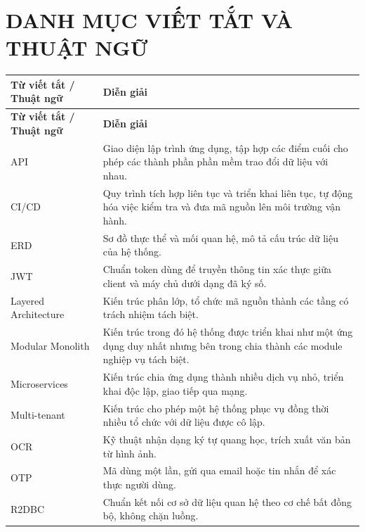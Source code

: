 \documentclass[12pt,a4paper,oneside]{report}
\begin{document}
\newpage
\listoffigures
{}

\newpage
\listoftables
{}

\newpage
\chapter*{DANH MỤC VIẾT TẮT VÀ THUẬT NGỮ}

\renewcommand{\arraystretch}{1.3}
\begin{longtable}{|>{\raggedright\arraybackslash}p{3.2cm}|>{\raggedright\arraybackslash}p{11.3cm}|}
\hline
\textbf{Từ viết tắt / Thuật ngữ} & \textbf{Diễn giải} \\ \hline
\endfirsthead
\hline
\textbf{Từ viết tắt / Thuật ngữ} & \textbf{Diễn giải} \\ \hline
\endhead
API & Giao diện lập trình ứng dụng, tập hợp các điểm cuối cho phép các thành phần phần mềm trao đổi dữ liệu với nhau. \\ \hline
CI/CD & Quy trình tích hợp liên tục và triển khai liên tục, tự động hóa việc kiểm tra và đưa mã nguồn lên môi trường vận hành. \\ \hline
ERD & Sơ đồ thực thể và mối quan hệ, mô tả cấu trúc dữ liệu của hệ thống. \\ \hline
JWT & Chuẩn token dùng để truyền thông tin xác thực giữa client và máy chủ dưới dạng đã ký số. \\ \hline
Layered Architecture & Kiến trúc phân lớp, tổ chức mã nguồn thành các tầng có trách nhiệm tách biệt. \\ \hline
Modular Monolith & Kiến trúc trong đó hệ thống được triển khai như một ứng dụng duy nhất nhưng bên trong chia thành các module nghiệp vụ tách biệt. \\ \hline
Microservices & Kiến trúc chia ứng dụng thành nhiều dịch vụ nhỏ, triển khai độc lập, giao tiếp qua mạng. \\ \hline
Multi-tenant & Kiến trúc cho phép một hệ thống phục vụ đồng thời nhiều tổ chức với dữ liệu được cô lập. \\ \hline
OCR & Kỹ thuật nhận dạng ký tự quang học, trích xuất văn bản từ hình ảnh. \\ \hline
OTP & Mã dùng một lần, gửi qua email hoặc tin nhắn để xác thực người dùng. \\ \hline
R2DBC & Chuẩn kết nối cơ sở dữ liệu quan hệ theo cơ chế bất đồng bộ, không chặn luồng. \\ \hline

\end{longtable}
\end{document}
